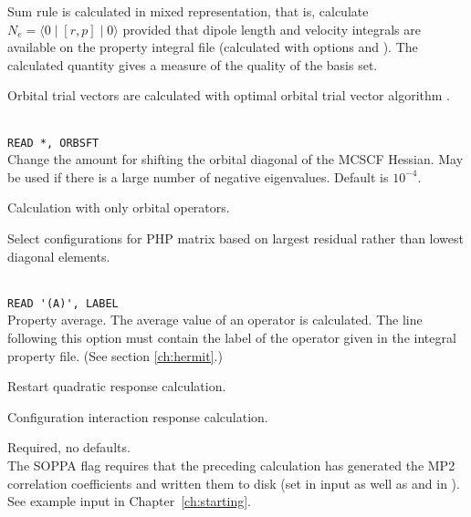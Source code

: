 \begin{description}
\item{}
Sum rule is calculated in mixed representation, that is, calculate
$N_e=\langle0\mid [r,p] \mid0\rangle$ provided that dipole length and
velocity integrals are available on the property integral file 
(calculated with  options  and ).
The calculated quantity gives a measure of the quality of the basis
set.

\item{}
Orbital trial vectors are calculated with optimal orbital
trial vector
algorithm \cite{tuhjahjajpjjcp84}.

\item{}\\
\verb|READ *, ORBSFT|\\
Change the amount for shifting the orbital diagonal of the MCSCF Hessian.
May be used if there is a large number of negative eigenvalues.
Default is $10^{-4}$. 

\item{}
Calculation with only orbital operators. 

\item{}
Select configurations for PHP matrix based on largest residual
rather than lowest diagonal elements.

\item{} \\
\verb|READ '(A)', LABEL|\\
Property average. The average value of an
operator is calculated. 
The line following this option must contain the
label of the operator given in the integral property file.
(See section \ref{ch:hermit}.)

\item{}
Restart quadratic response calculation.

\item{}
Configuration interaction
response calculation. 

\item{}
Required, no defaults. \\
The SOPPA flag requires that
the preceding {\sir} calculation has generated the MP2 correlation
coefficients and written them to disk (set  in 
input as well as  and  in ). See
example input in Chapter~\ref{ch:starting}.


\end{description}
